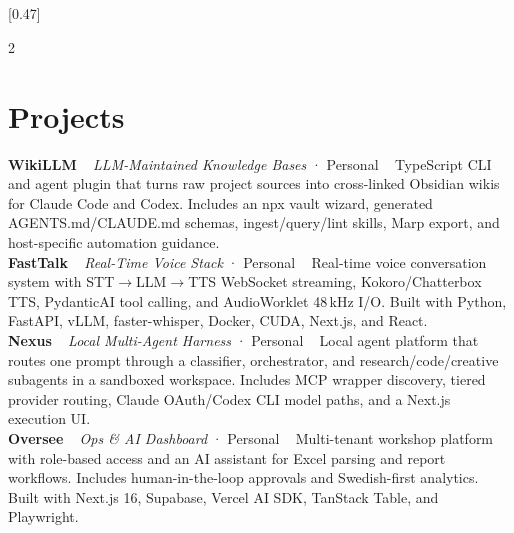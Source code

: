 \documentclass{modernsimplecv}
\newcommand{\cvevent}[4]{
    \textbf{#1} \ %
    \emph{#2} · #3 \ %
    \small{#4} \\[1em] %
}
\newlength{\leftcolwidth}
\begin{document}

\subsection*{}
\vspace{-3em}

\setlength{\columnsep}{1.5cm}
[0.47]
\begin{paracol}{2}

\paracolbackgroundoptions



\footnotesize
{
\begin{minipage}[t]{\leftcolwidth}
\small
\section*{Projects}

\cvevent{WikiLLM}{LLM-Maintained Knowledge Bases}{Personal}{%
TypeScript CLI and agent plugin that turns raw project sources into cross-linked Obsidian wikis for Claude Code and Codex. Includes an npx vault wizard, generated AGENTS.md/CLAUDE.md schemas, ingest/query/lint skills, Marp export, and host-specific automation guidance.
}

\cvevent{FastTalk}{Real-Time Voice Stack}{Personal}{%
Real-time voice conversation system with STT$\rightarrow$LLM$\rightarrow$TTS WebSocket streaming, Kokoro/Chatterbox TTS, PydanticAI tool calling, and AudioWorklet 48\,kHz I/O. Built with Python, FastAPI, vLLM, faster-whisper, Docker, CUDA, Next.js, and React.
}

\cvevent{Nexus}{Local Multi-Agent Harness}{Personal}{%
Local agent platform that routes one prompt through a classifier, orchestrator, and research/code/creative subagents in a sandboxed workspace. Includes MCP wrapper discovery, tiered provider routing, Claude OAuth/Codex CLI model paths, and a Next.js execution UI.
}

\cvevent{Oversee}{Ops \& AI Dashboard}{Personal}{%
Multi-tenant workshop platform with role-based access and an AI assistant for Excel parsing and report workflows. Includes human-in-the-loop approvals and Swedish-first analytics. Built with Next.js 16, Supabase, Vercel AI SDK, TanStack Table, and Playwright.
}


\end{minipage}}
\end{paracol}
\end{document}
